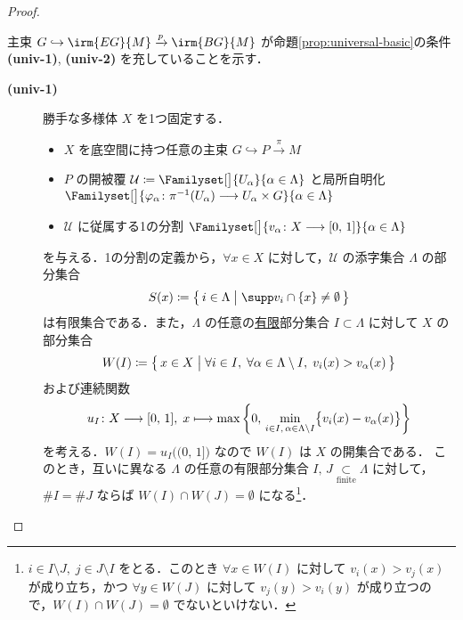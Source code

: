 \documentclass[TQFT_main]{subfiles}
\begin{document}
\begin{proof}
\begin{description}
        主束 $G \hookrightarrow \irm{EG}{M} \xrightarrow{p} \irm{BG}{M}$ が命題\ref{prop:universal-basic}の条件 \textsf{\textbf{(univ-1)}}, \textsf{\textbf{(univ-2)}} を充していることを示す．
        \begin{description}
            \item[\textbf{(univ-1)}]  勝手な多様体 $X$ を1つ固定する．
            \begin{itemize}
                \item $X$ を底空間に持つ任意の主束 $G \hookrightarrow P \xrightarrow{\pi} M$
                \item $P$ の開被覆 $\mathcal{U} \coloneqq \Familyset[\big]{U_\alpha}{\alpha \in \Lambda}$ と局所自明化 $\Familyset[\big]{\varphi_\alpha \colon \pi^{-1}(U_\alpha) \lto U_\alpha \times G}{\alpha \in \Lambda}$
                \item $\mathcal{U}$ に従属する1の分割 $\Familyset[\big]{v_\alpha \colon X \lto [0,\, 1]}{\alpha \in \Lambda}$
            \end{itemize}
            を与える．1の分割の定義から，$\forall x \in X$ に対して，$\mathcal{U}$ の添字集合 $\Lambda$ の部分集合
            \begin{align}
                S(x) \coloneqq \bigl\{\, i \in \Lambda \bigm| \supp v_i \cap \{x\} \neq \emptyset\,\bigr\} 
            \end{align}
            は有限集合である．また，$\Lambda$ の任意の\underline{有限}部分集合 $I \subset \Lambda$ に対して $X$ の部分集合
            \begin{align}
                W(I) \coloneqq \bigl\{\, x \in X \bigm| \forall i \in I,\; \forall \alpha \in \Lambda \setminus I,\; v_i (x) > v_\alpha (x) \,\bigr\} 
            \end{align}
            および連続関数
            \begin{align}
                u_I \colon X \longrightarrow [0,\, 1],\; x \longmapsto \max \left\{ 0,\, \min_{i \in I,\, \alpha \in \Lambda \setminus I}\bigl\{ v_i(x) - v_\alpha(x) \bigr\}  \right\}
            \end{align}
            を考える．$W(I) = u_I \bigl( (0,\,1] \bigr)$ なので $W(I)$ は $X$ の開集合である．
            このとき，互いに異なる $\Lambda$ の任意の有限部分集合 $I,\, J \underset{\text{finite}}{\subset} \Lambda$ に対して，$\# I = \# J$ ならば $W(I) \cap W(J) = \emptyset$ になる\footnote{$i \in I \setminus J,\; j \in J \setminus I$ をとる．このとき $\forall x \in W(I)$ に対して $v_i(x) > v_j(x)$ が成り立ち，かつ $\forall y \in W(J)$ に対して $v_j(y) > v_i(y)$ が成り立つので，$W(I) \cap W(J) = \emptyset$ でないといけない．}．

\end{description}
\end{description}
\end{proof}
\end{document}
